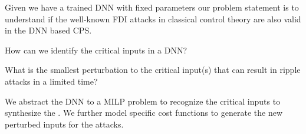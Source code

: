 Given we have a trained DNN with fixed parameters our problem statement is to understand if the well-known FDI attacks in classical control theory are also valid in the DNN based CPS.
\begin{problem}
	How can we identify the critical inputs in a DNN?
\end{problem}


\begin{problem}
	What is the smallest perturbation to the critical input(s) that can result in ripple attacks in a limited time?
\end{problem}

\begin{approach*}
	We abstract the DNN to a MILP problem to recognize the critical inputs to synthesize the \attack. We further model \attack specific cost functions to generate the new perturbed inputs for the attacks. 
\end{approach*}
